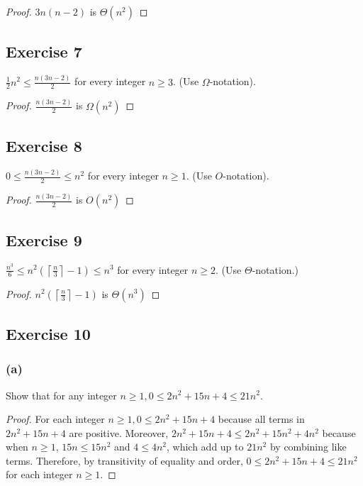 \documentclass[14pt]{extarticle}
\newcommand{\dps}{\displaystyle}
\newcommand{\ceil}[1]{{\left\lceil#1\right\rceil}}
\begin{document}
\begin{proof}
\(3n(n - 2)\) is \(\Theta(n^2)\)
\end{proof}

\subsection{Exercise 7}
\(\dps \frac{1}{2}n^2 \leq \frac{n(3n-2)}{2}\) for every integer \(n \geq 3\). (Use \(\Omega\)-notation).

\begin{proof}
\(\dps \frac{n(3n-2)}{2}\) is \(\Omega(n^2)\)
\end{proof}

\subsection{Exercise 8}
\(\dps 0 \leq \frac{n(3n-2)}{2} \leq n^2\) for every integer \(n \geq 1\). (Use \(O\)-notation).

\begin{proof}
\(\dps \frac{n(3n-2)}{2}\) is \(O(n^2)\)
\end{proof}

\subsection{Exercise 9}
\(\dps \frac{n^3}{6} \leq n^2 \left(\ceil{\frac{n}{3}} - 1\right) \leq n^3\) for every integer \(n \geq 2\). 
(Use \(\Theta\)-notation.)

\begin{proof}
\(\dps n^2\left(\ceil{\frac{n}{3}} - 1\right)\) is \(\Theta(n^3)\)
\end{proof}

\subsection{Exercise 10}
\subsubsection{(a)}
Show that for any integer \(n \geq 1, 0 \leq 2n^2 + 15n + 4 \leq 21n^2\).

\begin{proof}
For each integer \(n \geq 1, 0 \leq 2n^2 + 15n + 4\) because all terms in \(2n^2 + 15n + 4\) are positive. Moreover, 
\(2n^2 + 15n + 4 \leq 2n^2 + 15n^2 + 4n^2\) because when \(n \geq 1\), \(15n \leq 15n^2\) and \(4 \leq 4n^2\), which add up 
to \(21n^2\) by combining like terms. Therefore, by transitivity of equality and order, \(0 \leq 2n^2 + 15n + 4 
\leq 21n^2\) for each integer \(n \geq 1\).
\end{proof}
\end{document}
